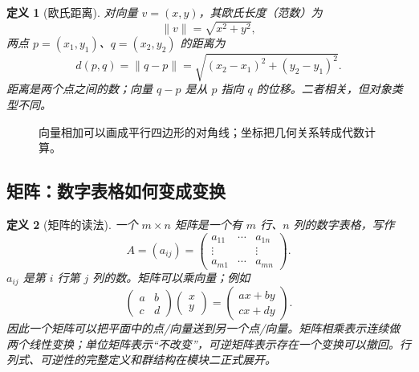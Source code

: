 \documentclass[UTF8,fontset=none,a4paper,11pt]{ctexart}
\theoremstyle{foundation-definition}
\newtheorem{definition}{定义}[section]
\theoremstyle{foundation-theorem}
\theoremstyle{foundation-proposition}
\theoremstyle{foundation-example}
\theoremstyle{foundation-remark}
\theoremstyle{foundation-theorem}
\begin{document}
\begin{definition}[欧氏距离]\label{def:distance}
对向量 \(v=(x,y)\)，其欧氏长度（范数）为
\[
\|v\|=\sqrt{x^2+y^2},
\]
两点 \(p=(x_1,y_1)\)、\(q=(x_2,y_2)\) 的距离为
\[
d(p,q)=\|q-p\|=\sqrt{(x_2-x_1)^2+(y_2-y_1)^2}.
\]
距离是两个点之间的数；向量 \(q-p\) 是从 \(p\) 指向 \(q\) 的位移。二者相关，但对象类型不同。
\end{definition}

\begin{figure}[htbp]
\centering
{}
\caption{向量相加可以画成平行四边形的对角线；坐标把几何关系转成代数计算。}
\label{fig:vector-addition}
\end{figure}

\subsection{矩阵：数字表格如何变成变换}

\begin{definition}[矩阵的读法]\label{def:matrix-read}
一个 \(m\times n\) 矩阵是一个有 \(m\) 行、\(n\) 列的数字表格，写作
\[
A=(a_{ij})=\begin{pmatrix}
a_{11}&\cdots&a_{1n}\\
\vdots&&\vdots\\
a_{m1}&\cdots&a_{mn}
\end{pmatrix}.
\]
\(a_{ij}\) 是第 \(i\) 行第 \(j\) 列的数。矩阵可以乘向量；例如
\[
\begin{pmatrix}a&b\\c&d\end{pmatrix}
\begin{pmatrix}x\\y\end{pmatrix}
=\begin{pmatrix}ax+by\\cx+dy\end{pmatrix}.
\]
因此一个矩阵可以把平面中的点/向量送到另一个点/向量。矩阵相乘表示连续做两个线性变换；单位矩阵表示“不改变”，可逆矩阵表示存在一个变换可以撤回。行列式、可逆性的完整定义和群结构在模块二正式展开。
\end{definition}
\end{document}
